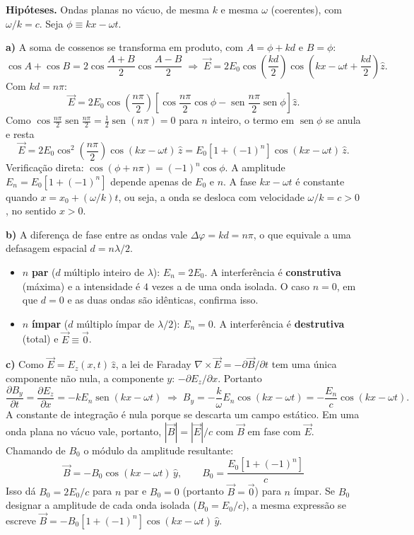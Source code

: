 \documentclass{article}%
\begin{document}
\textbf{Hipóteses.} Ondas planas no vácuo, de mesma $k$ e mesma $\omega$ (coerentes), com $\omega/k=c$. Seja $\phi\equiv kx-\omega t$.

\textbf{a)} A soma de cossenos se transforma em produto, com $A=\phi+kd$ e $B=\phi$:
\[
\cos A+\cos B=2\cos\frac{A+B}{2}\cos\frac{A-B}{2}
\;\Rightarrow\;
\vec E=2E_0\cos\!\left(\frac{kd}{2}\right)\cos\!\left(kx-\omega t+\frac{kd}{2}\right)\hat z .
\]
Com $kd=n\pi$:
\[
\vec E=2E_0\cos\!\left(\frac{n\pi}{2}\right)\left[\cos\frac{n\pi}{2}\cos\phi-\operatorname{sen}\frac{n\pi}{2}\operatorname{sen}\phi\right]\hat z .
\]
Como $\cos\frac{n\pi}{2}\operatorname{sen}\frac{n\pi}{2}=\frac{1}{2}\operatorname{sen}(n\pi)=0$ para $n$ inteiro, o termo em $\operatorname{sen}\phi$ se anula e resta
\[
\boxed{\vec E=2E_0\cos^2\!\left(\frac{n\pi}{2}\right)\cos(kx-\omega t)\,\hat z=E_0\left[1+(-1)^n\right]\cos(kx-\omega t)\,\hat z.}
\]
Verificação direta: $\cos(\phi+n\pi)=(-1)^n\cos\phi$. A amplitude $E_n=E_0[1+(-1)^n]$ depende apenas de $E_0$ e $n$. A fase $kx-\omega t$ é constante quando $x=x_0+(\omega/k)t$, ou seja, a onda se desloca com velocidade $\omega/k=c>0$, no sentido $x>0$.

\textbf{b)} A diferença de fase entre as ondas vale $\Delta\varphi=kd=n\pi$, o que equivale a uma defasagem espacial $d=n\lambda/2$.
\begin{itemize}
\item $n$ \textbf{par} ($d$ múltiplo inteiro de $\lambda$): $E_n=2E_0$. A interferência é \textbf{construtiva} (máxima) e a intensidade é $4$ vezes a de uma onda isolada. O caso $n=0$, em que $d=0$ e as duas ondas são idênticas, confirma isso.
\item $n$ \textbf{ímpar} ($d$ múltiplo ímpar de $\lambda/2$): $E_n=0$. A interferência é \textbf{destrutiva} (total) e $\vec E\equiv\vec 0$.
\end{itemize}

\textbf{c)} Como $\vec E=E_z(x,t)\,\hat z$, a lei de Faraday $\nabla\times\vec E=-\partial\vec B/\partial t$ tem uma única componente não nula, a componente $y$: $-\partial E_z/\partial x$. Portanto
\[
\frac{\partial B_y}{\partial t}=\frac{\partial E_z}{\partial x}=-kE_n\operatorname{sen}(kx-\omega t)
\;\Rightarrow\;
B_y=-\frac{k}{\omega}E_n\cos(kx-\omega t)=-\frac{E_n}{c}\cos(kx-\omega t).
\]
A constante de integração é nula porque se descarta um campo estático. Em uma onda plana no vácuo vale, portanto, $|\vec B|=|\vec E|/c$ com $\vec B$ em fase com $\vec E$. Chamando de $B_0$ o módulo da amplitude resultante:
\[
\boxed{\vec B=-B_0\cos(kx-\omega t)\,\hat y,\qquad B_0=\frac{E_0\left[1+(-1)^n\right]}{c}}
\]
Isso dá $B_0=2E_0/c$ para $n$ par e $B_0=0$ (portanto $\vec B=\vec 0$) para $n$ ímpar. Se $B_0$ designar a amplitude de cada onda isolada ($B_0=E_0/c$), a mesma expressão se escreve $\vec B=-B_0[1+(-1)^n]\cos(kx-\omega t)\,\hat y$.
\end{document}
